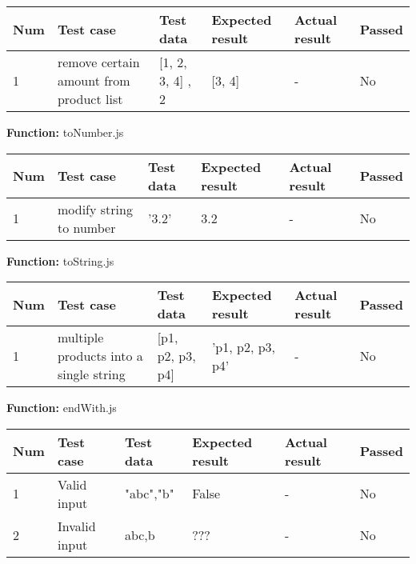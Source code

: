 \documentclass[a4paper, 12pt]{article}
\begin{document}
        \begin{table}[h!]
           \begin{tabular}{|l|p{3cm}|p{2cm}|p{2cm}|p{2.5cm}|l|}
                \hline
                Num & Test case        							& Test data 					& Expected result 					& Actual result 		& Passed \\ \hline
                1   & remove certain amount from product list 	& {[}1, 2, 3, 4{]} , 2     		& {[}3, 4{]}               			& -             		& No     \\ \hline
            \end{tabular}
        \end{table}
        
        \textbf{Function:} toNumber.js
        
        \begin{table}[h!]
           \begin{tabular}{|l|p{3cm}|p{2cm}|p{2cm}|p{2.5cm}|l|}
                \hline
                Num & Test case        					& Test data 					& Expected result 					& Actual result 		& Passed \\ \hline
                1   & modify string to number 			& '3.2'     					& 3.2               				& -             		& No     \\ \hline
            \end{tabular}
        \end{table}
    
        \textbf{Function:} toString.js
        
        \begin{table}[h!]
           \begin{tabular}{|l|p{3cm}|p{2cm}|p{2cm}|p{2.5cm}|l|}
                \hline
                Num & Test case        										& Test data 					& Expected result 					& Actual result 		& Passed \\ \hline
                1   & multiple products into a single string 				& {[}p1, p2, p3, p4{]}     		& 'p1, p2, p3, p4'                	& -             		& No     \\ \hline
            \end{tabular}
        \end{table}
    
        \textbf{Function:} endWith.js
        
        \begin{table}[h!]
           \begin{tabular}{|l|p{3cm}|p{2cm}|p{2cm}|p{2.5cm}|l|}
                \hline
                Num & Test case        					& Test data 					& Expected result 					& Actual result 		& Passed \\ \hline
                1   & Valid input 						& "abc","b"      				& False                				& -             		& No     \\ \hline
                2   & Invalid input 					& abc,b     					& ???               				& -             		& No     \\ \hline
            \end{tabular}
        \end{table}
    
\end{document}
